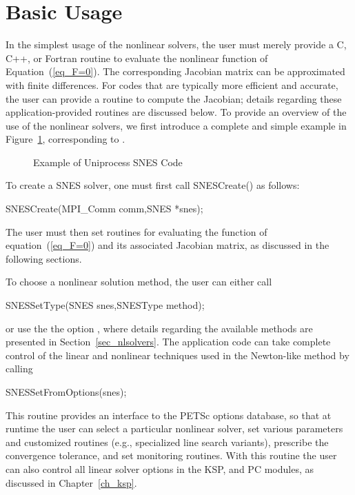 \section{Basic Usage}
\label{sec_snesusage}

In the simplest usage of the nonlinear solvers, the user must merely 
provide a C, C++, or Fortran routine to evaluate the nonlinear function 
of Equation~(\ref{eq_F=0}).
The corresponding Jacobian  matrix 
can be approximated with finite differences.
For codes that are typically more efficient and accurate, the
user can provide a routine to compute the Jacobian; details regarding these application-provided 
routines are discussed below.  
To provide an overview of the use of the nonlinear solvers,
we first introduce a complete and simple example in
Figure~\ref{fig_snesexample}, corresponding to 
.  

\begin{figure}[H]
{\small
{}
}
\caption{Example of Uniprocess SNES Code}
\label{fig_snesexample}
\end{figure}

To create a SNES solver, one must first call SNESCreate() as follows:
\begin{tabbing}
  SNESCreate(MPI\_Comm comm,SNES *snes);\\
\end{tabbing}
The user must then set
routines for evaluating the function of equation~(\ref{eq_F=0}) and its
associated Jacobian matrix, as discussed in the following sections.

To choose a nonlinear solution method, the user can either
call 
\begin{tabbing}
  SNESSetType(SNES snes,SNESType method);
\end{tabbing}
or use the the option ,  
where details regarding the available methods are presented in
Section~\ref{sec_nlsolvers}.
The application code can take complete control of the linear and
nonlinear techniques used in the Newton-like method by calling
\begin{tabbing}
  SNESSetFromOptions(snes);
\end{tabbing}
This routine provides an interface to the PETSc options database, so
that at runtime the user can select a particular nonlinear solver, set
various parameters and customized routines (e.g., specialized line
search variants), prescribe the convergence tolerance, and set
monitoring routines.  With this routine the user can also control all
linear solver options in the KSP, and PC modules, as discussed
in Chapter~\ref{ch_ksp}.

